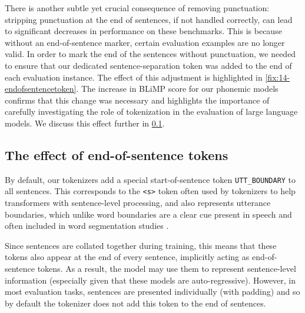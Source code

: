 There is another subtle yet crucial consequence of removing punctuation: stripping punctuation at the end of sentences, if not handled correctly, can lead to significant decreases in performance on these benchmarks. This is because without an end-of-sentence marker, certain evaluation examples are no longer valid. In order to mark the end of the sentences without punctuation, we needed to ensure that our dedicated sentence-separation token was added to the end of each evaluation instance. The effect of this adjustment is highlighted in \cref{fix:14-endofsentencetoken}. The increase in BLiMP score for our phonemic models confirms that this change was necessary and highlights the importance of carefully investigating the role of tokenization in the evaluation of large language models. We discuss this effect further in \cref{sec:14-endofsentence}.


\subsection{The effect of end-of-sentence tokens}
\label{sec:14-endofsentence}

By default, our tokenizers add a special start-of-sentence token \texttt{UTT\_BOUNDARY} to all sentences. This corresponds to the \texttt{<s>} token often used by tokenizers to help transformers with sentence-level processing, and also represents utterance boundaries, which unlike word boundaries are a clear cue present in speech and often included in word segmentation studies \citep{feliciano-de-faria-2019-utterance-boundaries}. 

Since sentences are collated together during training, this means that these tokens also appear at the end of every sentence, implicitly acting as end-of-sentence tokens. As a result, the model may use them to represent sentence-level information (especially given that these models are auto-regressive). However, in most evaluation tasks, sentences are presented individually (with padding) and so by default the tokenizer does not add this token to the end of sentences. 

